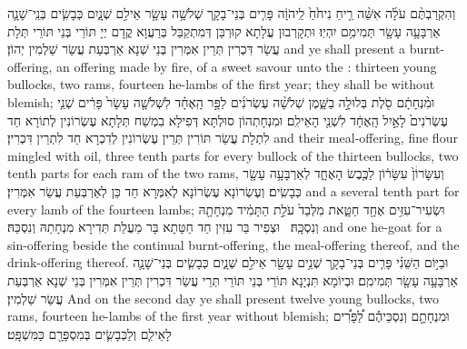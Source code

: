{וְהִקְרַבְתֶּ֨ם עֹלָ֜ה אִשֵּׁ֨ה רֵ֤יחַ נִיחֹ֙חַ֙ לַֽיהֹוָ֔ה פָּרִ֧ים בְּנֵי־בָקָ֛ר שְׁלֹשָׁ֥ה עָשָׂ֖ר אֵילִ֣ם שְׁנָ֑יִם כְּבָשִׂ֧ים בְּנֵֽי־שָׁנָ֛ה אַרְבָּעָ֥ה עָשָׂ֖ר תְּמִימִ֥ם יִהְיֽוּ׃}
{וּתְקָרְבוּן עֲלָתָא קוּרְבַּן דְּמִתְקַבַּל בְּרַעֲוָא קֳדָם יְיָ תּוֹרֵי בְּנֵי תּוֹרֵי תְּלָת עֲשַׂר דִּכְרִין תְּרֵין אִמְּרִין בְּנֵי שְׁנָא אַרְבְּעַת עֲשַׂר שַׁלְמִין יְהוֹן׃}
{and ye shall present a burnt-offering, an offering made by fire, of a sweet savour unto the \lord: thirteen young bullocks, two rams, fourteen he-lambs of the first year; they shall be without blemish;}{}
{וּמִ֨נְחָתָ֔ם סֹ֖לֶת בְּלוּלָ֣ה בַשָּׁ֑מֶן שְׁלֹשָׁ֨ה עֶשְׂרֹנִ֜ים לַפָּ֣ר הָֽאֶחָ֗ד לִשְׁלֹשָׁ֤ה עָשָׂר֙ פָּרִ֔ים שְׁנֵ֤י עֶשְׂרֹנִים֙ לָאַ֣יִל הָֽאֶחָ֔ד לִשְׁנֵ֖י הָאֵילִֽם׃}
{וּמִנְחָתְהוֹן סוּלְתָּא דְּפִילָא בִמְשַׁח תְּלָתָא עֶשְׂרוֹנִין לְתוֹרָא חַד לִתְלָת עֲשַׂר תּוֹרִין תְּרֵין עֶשְׂרוֹנִין לְדִכְרָא חַד לִתְרֵין דִּכְרִין׃}
{and their meal-offering, fine flour mingled with oil, three tenth parts for every bullock of the thirteen bullocks, two tenth parts for each ram of the two rams,}{}
{וְעִשָּׂרוֹׄן֙ עִשָּׂר֔וֹן לַכֶּ֖בֶשׂ הָאֶחָ֑ד לְאַרְבָּעָ֥ה עָשָׂ֖ר כְּבָשִֽׂים׃}
{וְעֶשְׂרוֹנָא עֶשְׂרוֹנָא לְאִמְּרָא חַד כֵּן לְאַרְבְּעַת עֲשַׂר אִמְּרִין׃}
{and a several tenth part for every lamb of the fourteen lambs;}{}
{וּשְׂעִיר־עִזִּ֥ים אֶחָ֖ד חַטָּ֑את מִלְּבַד֙ עֹלַ֣ת הַתָּמִ֔יד מִנְחָתָ֖הּ וְנִסְכָּֽהּ׃ \setuma }
{וּצְפִיר בַּר עִזִּין חַד חַטָּתָא בָּר מֵעֲלַת תְּדִירָא מִנְחָתַהּ וְנִסְכַּהּ׃}
{and one he-goat for a sin-offering beside the continual burnt-offering, the meal-offering thereof, and the drink-offering thereof.}{}
{וּבַיּ֣וֹם הַשֵּׁנִ֗י פָּרִ֧ים בְּנֵי־בָקָ֛ר שְׁנֵ֥ים עָשָׂ֖ר אֵילִ֣ם שְׁנָ֑יִם כְּבָשִׂ֧ים בְּנֵי־שָׁנָ֛ה אַרְבָּעָ֥ה עָשָׂ֖ר תְּמִימִֽם׃}
{וּבְיוֹמָא תִּנְיָנָא תּוֹרֵי בְּנֵי תּוֹרֵי תְּרֵי עֲשַׂר דִּכְרִין תְּרֵין אִמְּרִין בְּנֵי שְׁנָא אַרְבְּעַת עֲשַׂר שַׁלְמִין׃}
{And on the second day ye shall present twelve young bullocks, two rams, fourteen he-lambs of the first year without blemish;}{}
{וּמִנְחָתָ֣ם וְנִסְכֵּיהֶ֡ם לַ֠פָּרִ֠ים לָאֵילִ֧ם וְלַכְּבָשִׂ֛ים בְּמִסְפָּרָ֖ם כַּמִּשְׁפָּֽט׃
}
